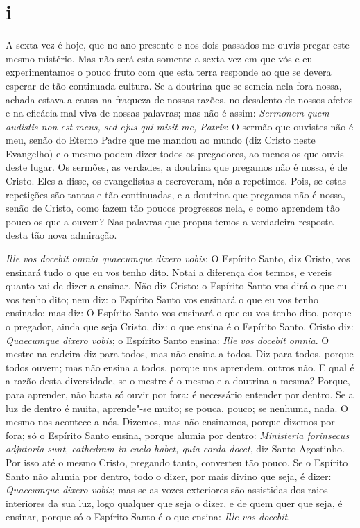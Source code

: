 \section*{i}

\noindent{}A sexta vez é hoje, que no ano presente e nos dois passados me ouvis
pregar este mesmo mistério. Mas não será esta somente a sexta vez em que
vós e eu experimentamos o pouco fruto com que esta terra responde ao que
se devera esperar de tão continuada cultura. Se a doutrina que se semeia
nela fora nossa, achada estava a causa na fraqueza de nossas razões, no
desalento de nossos afetos e na eficácia mal viva de nossas palavras;
mas não é assim: \emph{Sermonem quem audistis non est meus, sed ejus qui
misit me, Patris}: O sermão que ouvistes não é meu, senão %
do Eterno Padre que me mandou ao mundo (diz Cristo neste Evangelho)
e o mesmo podem dizer todos os pregadores, ao menos os que ouvis
deste lugar. Os sermões, as verdades, a doutrina que pregamos não é
nossa, é de Cristo. Eles a disse, os evangelistas a escreveram, nós a
repetimos. Pois, se estas repetições são tantas e tão continuadas, e a
doutrina que pregamos não é nossa, senão de Cristo, como fazem tão
poucos progressos nela, e como aprendem tão pouco os que a ouvem? Nas
palavras que propus temos a verdadeira resposta desta tão nova
admiração.

\emph{Ille vos docebit omnia quaecumque dixero vobis}: O Espírito Santo,
diz Cristo, vos ensinará tudo o que eu vos tenho dito. Notai
a diferença dos termos, e vereis quanto vai de dizer a ensinar. Não diz
Cristo: o Espírito Santo vos dirá o que eu vos tenho dito; nem diz: o
Espírito Santo vos ensinará o que eu vos tenho ensinado; mas diz: O
Espírito Santo vos ensinará o que eu vos tenho dito, porque o pregador,
ainda que seja Cristo, diz: o que ensina é o Espírito Santo. Cristo diz:
\emph{Quaecumque dixero vobis}; o Espírito Santo ensina: \emph{Ille vos
docebit omnia}. O mestre na cadeira diz para todos, mas não ensina a
todos. Diz para todos, porque todos ouvem; mas não ensina a todos,
porque uns aprendem, outros não. E qual é a razão desta diversidade, se
o mestre é o mesmo e a doutrina a mesma? Porque, para aprender, não
basta só ouvir por fora: é necessário entender por dentro. Se a luz de
dentro é muita, aprende"-se muito; se pouca, pouco; se nenhuma, nada. O
mesmo nos acontece a nós. Dizemos, mas não ensinamos, porque dizemos por
fora; só o Espírito Santo ensina, porque alumia por dentro:
\emph{Ministeria forinsecus adjutoria sunt, cathedram in caelo habet,
quia corda docet}, diz Santo Agostinho. Por isso até o mesmo Cristo,
pregando tanto, converteu tão pouco. Se o Espírito Santo não alumia por
dentro, todo o dizer, por mais divino que seja, é dizer:
\emph{Quaecumque dixero vobis}; mas se as vozes exteriores são
assistidas dos raios interiores da sua luz, logo qualquer que seja o
dizer, e de quem quer que seja, é ensinar, porque só o Espírito Santo é
o que ensina: \emph{Ille vos docebit}.

